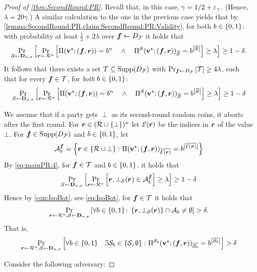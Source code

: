 \begin{proof}[Proof of \cref{thm:SecondRound:PR}]
Recall that, in this case, $\gamma=1/2+\eps_\gamma$. (Hence, $\lambda=20\gamma$.)
A similar calculation to the one in the previous case
yields that by \cref{lemma:SecondRound:PR,claim:SecondRound:PR:Validity}, for both $\o\in \zo$: with probability at least $\frac12 + 2\lambda$ over $\vf \gets \DF $ it holds that
\begin{align*}
\ppr{\cs \gets \bns}{\ppr{\vr \gets \rn}{\Pi(\vstar;(\vf,\vr)) = \o^n \qand \Pi^\cs(\vstar;(\vf,\vr))_\oS = \o^{\size{\oS}} } \ge \lambda}\ge 1-\delta.
\end{align*}
It follows that there exists a set $\cT \subseteq \SDF$ with $\ppr{\vf \gets \DF}{\cT}\ge 4\lambda$, such that for every $\vf\in \cT$, for \emph{both} $\o\in \zo$:
\begin{align}\label{eq:mainPR:4}
\ppr{\cs \gets \bns}{\ppr{\vr \gets \rn}{\Pi(\vstar;(\vf,\vr)) = \o^n \qand \Pi^\cs(\vstar;(\vf,\vr))_\oS = \o^{\size{\oS}} } \ge \lambda}\ge 1-\delta
\end{align}

We assume \wlg that if a party gets $\perp$ as its second-round random coins, it aborts after the first round. For $\vr \in (\cR\cup\sset{\bot})^n$ let $ \cE(\vr)$ be the indices in $\vr$ of the value $\bot$.
For $\vf \in \SDF$ and $\o \in \zo$, let
\begin{align}
\cA^\vf_\o = \set{\vr \in \rbot \colon \Pi(\vstar;(\vf,\vr))_{\overline{\cE(\vr)}} = \o^{\size{\overline{\cE(\vr)}}}}
\end{align}
By \cref{eq:mainPR:4}, for $\vf \in \cT$ and $\o\in \zo$, it holds that
\begin{align}
\ppr{\cs\gets \bns}{\ppr{\vr \gets \rn}{\vr,\bot_{\cS}(\vr) \in \cA^\vf_\o} \ge\lambda} \ge 1-\delta
\end{align}
Hence by \cref{con:IsoBot}, see \cref{eq:IsoBot}, for $\vf \in \cT$ it holds that
\begin{align*}
\ppr{\vr\gets \rn,\cS \gets \bns}{\forall \o \in \zo\colon \set{\vr,\bot_{\cS}(\vr)}\cap \cA_b \neq \emptyset} > \delta.
\end{align*}
That is,
\begin{align}\label{eq:PR:3}
\ppr{\vr\gets \cR^n,\cS \gets \bns}{\forall \o\in \zo \quad \exists \cs_\o \in \set{\cs,\emptyset} \colon \Pi^{\cS_\o}(\vstar;(\vf,\vr))_{\overline{\cS_\o}}= \o^{ \size{\overline{\cS_\o}}}} >\delta
\end{align}

{\samepage
	\noindent
	Consider the following adversary:
	
}
\end{proof}
